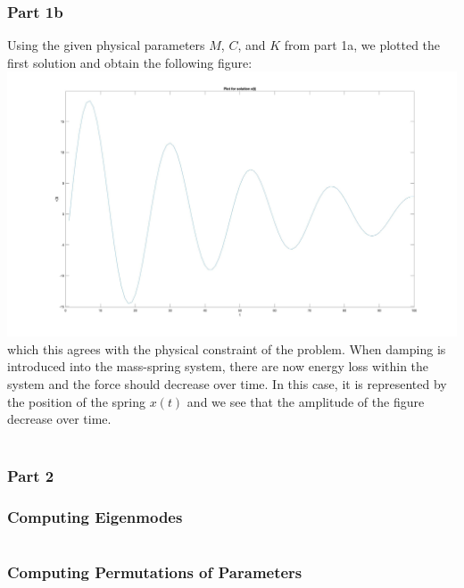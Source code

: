 \documentclass[10pt,a4paper]{article}
\begin{document}
\subsubsection{Part 1b}

Using the given physical parameters $M$, $C$, and $K$ from part 1a, we plotted the first solution and obtain the following figure:
\\
\includegraphics[scale = 0.15]{figures/P3_plot.jpg}
which this agrees with the physical constraint of the problem. When damping is introduced into the mass-spring system, there are now energy loss within the system and the force should decrease over time. In this case, it is represented by the position of the spring $x(t)$ and we see that the amplitude of the figure decrease over time. 
\\\\
\subsubsection{Part 2}

\subsubsection{Computing Eigenmodes}

\inputminted{python}{code/eigenmodes.py}

\subsubsection{Computing Permutations of Parameters}

\inputminted{python}{code/permutations.py}

\pagebreak

\printbibliography
\end{document}
